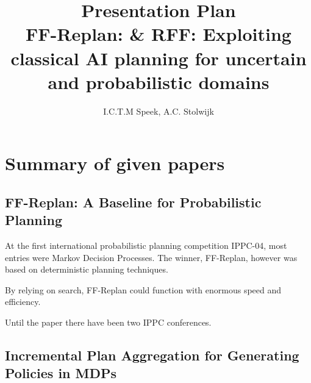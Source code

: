 \documentclass[runningheads,a4paper]{llncs}
\begin{document}
\mainmatter%

\title{Presentation Plan\\
FF-Replan: \& RFF\@: Exploiting classical AI planning for uncertain and probabilistic domains}


\author{I.C.T.M Speek, A.C. Stolwijk}

%



\maketitle

\section{Summary of given papers}

\subsection{FF-Replan: A Baseline for Probabilistic Planning}

At the first international probabilistic planning competition IPPC-04, most
entries were Markov Decision Processes. The winner, FF-Replan, however was
based on deterministic planning techniques.

By relying on search, FF-Replan could function with enormous speed and efficiency.

Until the paper there have been two IPPC conferences.

\subsection{Incremental Plan Aggregation for Generating Policies in MDPs}
\end{document}
